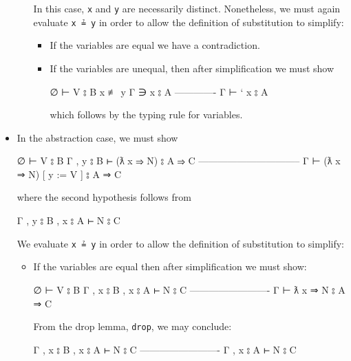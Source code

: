 \begin{itemize}
\begin{itemize}
    In this case, \texttt{x} and \texttt{y} are necessarily distinct.
    Nonetheless, we must again evaluate \texttt{x\ ≟\ y} in order to
    allow the definition of substitution to simplify:

    \begin{itemize}
    \item
      If the variables are equal we have a contradiction.
    \item
      If the variables are unequal, then after simplification we must
      show

      \begin{myDisplay}
      ∅ ⊢ V ⦂ B
      x ≢ y
      Γ ∋ x ⦂ A
      -------------
      Γ ⊢ ` x ⦂ A
      \end{myDisplay}

      which follows by the typing rule for variables.
    \end{itemize}
  \end{itemize}
\item
  In the abstraction case, we must show

  \begin{myDisplay}
  ∅ ⊢ V ⦂ B
  Γ , y ⦂ B ⊢ (ƛ x ⇒ N) ⦂ A ⇒ C
  --------------------------------
  Γ ⊢ (ƛ x ⇒ N) [ y := V ] ⦂ A ⇒ C
  \end{myDisplay}

  where the second hypothesis follows from

  \begin{myDisplay}
  Γ , y ⦂ B , x ⦂ A ⊢ N ⦂ C
  \end{myDisplay}

  We evaluate \texttt{x\ ≟\ y} in order to allow the definition of
  substitution to simplify:

  \begin{itemize}
  \item
    If the variables are equal then after simplification we must show:

    \begin{myDisplay}
    ∅ ⊢ V ⦂ B
    Γ , x ⦂ B , x ⦂ A ⊢ N ⦂ C
    -------------------------
    Γ ⊢ ƛ x ⇒ N ⦂ A ⇒ C
    \end{myDisplay}

    From the drop lemma, \texttt{drop}, we may conclude:

    \begin{myDisplay}
    Γ , x ⦂ B , x ⦂ A ⊢ N ⦂ C
    -------------------------
    Γ , x ⦂ A ⊢ N ⦂ C
    \end{myDisplay}


\end{itemize}
\end{itemize}
